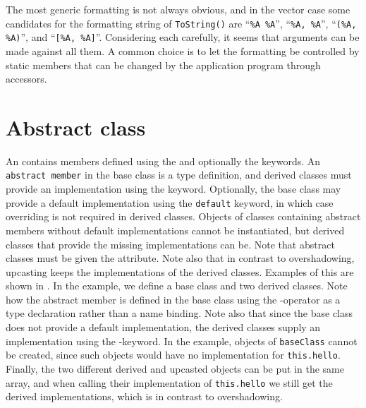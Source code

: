 The most generic formatting is not always obvious, and in the vector case some candidates for the formatting string of \lstinline{ToString()} are ``\lstinline{%A %A}'', ``\lstinline{%A, %A}'', ``\lstinline{(%A, %A)}'', and ``\lstinline{[%A, %A]}''.
 Considering each carefully, it seems that arguments can be made against all them. A common choice is to let the formatting be controlled by static members that can be changed by the application program through accessors.

\section{Abstract class}
\label{sec:abstract}
An  contains members defined using the  and optionally the  keywords. An \lstinline{abstract member} in the base class is a type definition, and derived classes must provide an implementation using the  keyword. Optionally, the base class may provide a default implementation using the \lstinline{default} keyword, in which case overriding is not required in derived classes. Objects of classes containing abstract members without default implementations cannot be instantiated, but derived classes that provide the missing implementations can be. Note that abstract classes must be given the  attribute. Note also that in contrast to overshadowing, upcasting keeps the implementations of the derived classes. Examples of this are shown in .
%
%
In the example, we define a base class and two derived classes. Note how the abstract member is defined in the base class using the \lexeme{:}-operator as a type declaration rather than a name binding. Note also that since the base class does not provide a default implementation, the derived classes supply an implementation using the -keyword. In the example, objects of \lstinline{baseClass} cannot be created, since such objects would have no implementation for \lstinline{this.hello}. Finally, the two different derived and upcasted objects can be put in the same array, and when calling their implementation of \lstinline{this.hello} we still get the derived implementations, which is in contrast to overshadowing.

